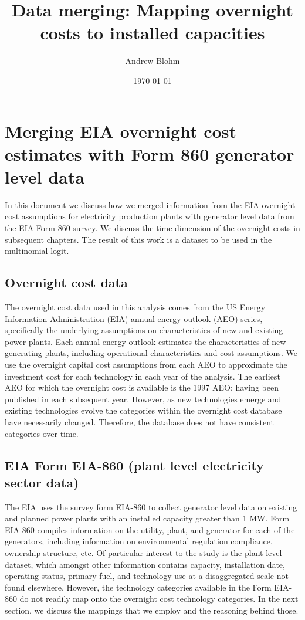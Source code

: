\documentclass[10pt]{amsart}
\title{Data merging: Mapping overnight costs to installed capacities}
\author{Andrew Blohm}
\date{\today}
\begin{document}
\maketitle

\section{Merging EIA overnight cost estimates with Form 860 generator level data}
In this document we discuss how we merged information from the EIA overnight cost assumptions for electricity production plants with generator level data from the EIA Form-860 survey.  
We discuss the time dimension of the overnight costs in subsequent chapters. 
The result of this work is a dataset to be used in the multinomial logit.

\subsection{Overnight cost data}
The overnight cost data used in this analysis comes from the US Energy Information Administration (EIA) annual energy outlook (AEO) series, specifically the underlying assumptions on characteristics of new and existing power plants. 
Each annual energy outlook estimates the characteristics of new generating plants, including operational characteristics and cost assumptions.
We use the overnight capital cost assumptions from each AEO to approximate the investment cost for each technology in each year of the analysis.
The earliest AEO for which the overnight cost is available is the 1997 AEO; having been published in each subsequent year.
However, as new technologies emerge and existing technologies evolve the categories within the overnight cost database have necessarily changed. 
Therefore, the database does not have consistent categories over time. 

\subsection{EIA Form EIA-860 (plant level electricity sector data)}
The EIA uses the survey form EIA-860 to collect generator level data on existing and planned power plants with an installed capacity greater than 1 MW. 
Form EIA-860 compiles information on the utility, plant, and generator for each of the generators, including information on environmental regulation compliance, ownership structure, etc.  
Of particular interest to the study is the plant level dataset, which amongst other information contains capacity, installation date, operating status, primary fuel, and technology use at a disaggregated scale not found elsewhere.
However, the technology categories available in the Form EIA-860 do not readily map onto the overnight cost technology categories. 
In the next section, we discuss the mappings that we employ and the reasoning behind those. 
\end{document}
